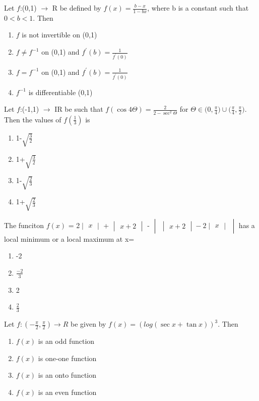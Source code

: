 \item Let $f$:(0,1) $\rightarrow$ R be defined by $f(x)=\frac{b-x}{1-bx}$, where b is a constant such that $0<b<1$. Then 
\begin{enumerate}
\item $f$ is not invertible on (0,1)
\item $f\neq f^{-1}$ on (0,1) and $f^{'}(b)=\frac{1}{f^{'}(0)}$
\item $f=f^{-1}$ on (0,1) and $f^{'}(b)=\frac{1}{f^{'}(0)}$
\item $f^{-1}$ is differentiable (0,1)
\end{enumerate}

\item Let $f$:(-1,1) $\rightarrow$ IR be such that $f(\cos 4\Theta)=\frac{2}{2-\sec^2\Theta}$ for $\Theta\in\Big(0,\frac{\pi}{4}\Big) \cup \Big(\frac{\pi}{4},\frac{\pi}{2}\Big)$. Then the values of $f(\frac{1}{3})$ is 
\begin{enumerate}
\item 1-$\sqrt{\frac{3}{2}}$
\item 1+$\sqrt{\frac{3}{2}}$
\item 1-$\sqrt{\frac{2}{3}}$
\item 1+$\sqrt{\frac{2}{3}}$
\end{enumerate}

\item The funciton 
$f(x)$ = 2$\begin{vmatrix} x \end{vmatrix}$
 + $\begin{vmatrix} x+2 \end{vmatrix}$
 - $\begin{vmatrix}\begin{vmatrix} x+2 \end{vmatrix} 
 - 2\begin{vmatrix} x \end{vmatrix}\end{vmatrix}$ has a local minimum or a local maximum at x=
\begin{enumerate}
\item -2
\item $\frac{-2}{3}$
\item 2
\item $\frac{2}{3}$
\end{enumerate}

\item Let $f: (-\frac{\pi}{2},\frac{\pi}{2})\rightarrow R$ be given by $f(x)=(log(\sec x+\tan x))^3$. Then
\begin{enumerate}
\item $f(x)$ is an odd function 
\item $f(x)$ is one-one function
\item $f(x)$ is an onto function
\item $f(x)$ is an even function
\end{enumerate}

